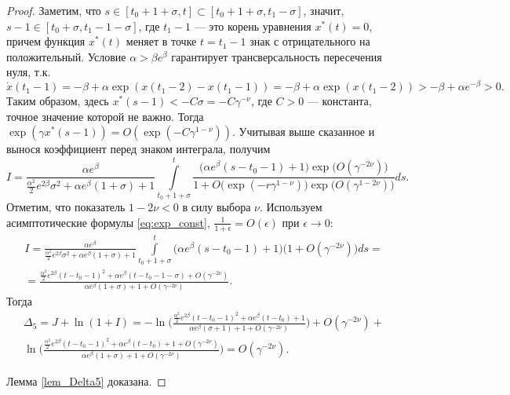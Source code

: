 \begin{proof}
Заметим, что $s \in [t_0 + 1 + \sigma, t] \subset [t_0 + 1 + \sigma, t_1 - \sigma]$, значит, $s - 1 \in [t_0 + \sigma, t_1 - 1 - \sigma]$, где $t_1 - 1$ --- это корень уравнения $x^*(t)=0$, причем функция $x^*(t)$ меняет в точке $t = t_1 - 1$ знак с отрицательного на положительный. Условие $\alpha > \beta e^{\beta}$ гарантирует трансверсальность пересечения нуля, т.к.
%
\[
\dot{x}(t_1 - 1) = -\beta + \alpha \exp(x(t_1 - 2) - x(t_1 - 1)) = -\beta + \alpha \exp(x(t_1 - 2)) > -\beta + \alpha e^{-\beta} > 0.
\]
%
Таким образом, здесь $x^*(s - 1) < -C \sigma = -C \gamma^{-\nu}$, где $C > 0$ --- константа, точное значение которой не важно. Тогда $\exp(\gamma x^*(s - 1))=O(\exp(-C \gamma^{1 - \nu}))$. Учитывая выше сказанное и вынося коэффициент перед знаком интеграла, получим  
\begin{equation*}
	I=\frac{\alpha e^\beta}
	{\frac{\alpha^2}{2}e^{2\beta}\sigma^2+\alpha e^{\beta}(1+\sigma)+1}
	\int\limits_{t_0+1+\sigma}^{t}
	\frac{\big(\alpha e^{\beta}(s-t_0-1)+1\big)\exp\big(O(\gamma^{-2\nu})\big)}
	{1+O\big(\exp({-r\gamma^{1-\nu}})\big) \exp\big(O(\gamma^{1-2\nu})\big)}
	ds. 
\end{equation*}
Отметим, что показатель $1-2\nu<0$ в силу выбора $\nu$. Используем асимптотические формулы \eqref{eq:exp_const}, $\frac{1}{1 + \epsilon} = O(\epsilon)$ при $\epsilon \to 0$:
%
\begin{multline*}
	I=\frac{\alpha e^\beta}
	{\frac{\alpha^2}{2}e^{2\beta}\sigma^2+\alpha e^{\beta}(1+\sigma)+1}
	\int\limits_{t_0+1+\sigma}^{t}
	\big(\alpha e^{\beta}(s-t_0-1)+1\big)\big(1+O(\gamma^{-2\nu})\big)
	ds=
	\\
	= \frac{\frac{\alpha^2}{2} e^{2\beta}(t-t_0-1)^2+\alpha e^\beta(t-t_0-1-\sigma)+O(\gamma^{-2\nu})}
	{\alpha e^{\beta}(1+\sigma)+1+O(\gamma^{-2\nu})}.
\end{multline*}
%
Тогда
\begin{multline}
	\Delta_5=J+\ln(1+I)=
	-\ln\Big(\frac{\frac{\alpha^2}{2}e^{2\beta}(t-t_0-1)^2+\alpha e^{\beta}(t-t_0)+1}{\alpha e^{\beta}(\sigma+1)+1+O(\gamma^{-2\nu})}\Big)+O(\gamma^{-2\nu})
	+
	\\
	\ln\Big(\frac{\frac{\alpha^2}{2} e^{2\beta}(t-t_0-1)^2+\alpha e^\beta(t-t_0)+1+O(\gamma^{-2\nu})}
	{\alpha e^{\beta}(1+\sigma)+1+O(\gamma^{-2\nu})}\Big)=O(\gamma^{-2\nu}).
\end{multline}        

Лемма \ref{lem_Delta5} доказана.

\end{proof}

